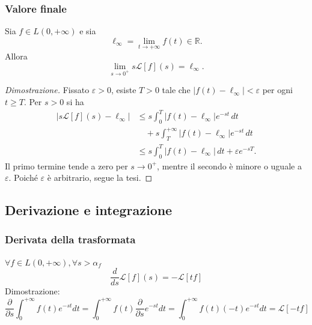             \subsubsection{Valore finale}
                Sia $f \in L(0,+\infty)$ e sia
                \[
                    \ell_\infty=\lim_{t\rightarrow+\infty}f(t)\in\mathbb{R}.
                \]
                Allora
                \[
                    \lim_{s\rightarrow0^+}s\mathcal{L}[f](s)=\ell_\infty.
                \]
                \begin{proof}[Dimostrazione]
                    Fissato $\varepsilon>0$, esiste $T>0$ tale che
                    $\lvert f(t)-\ell_\infty\rvert<\varepsilon$ per ogni
                    $t\geq T$. Per $s>0$ si ha
                    \begin{align*}
                        \lvert s\mathcal{L}[f](s)-\ell_\infty\rvert
                        &\leq s\int_0^T
                        \lvert f(t)-\ell_\infty\rvert e^{-st}\,dt \\
                        &\quad+s\int_T^{+\infty}
                        \lvert f(t)-\ell_\infty\rvert e^{-st}\,dt \\
                        &\leq s\int_0^T
                        \lvert f(t)-\ell_\infty\rvert\,dt
                        +\varepsilon e^{-sT}.
                    \end{align*}
                    Il primo termine tende a zero per $s\rightarrow0^+$,
                    mentre il secondo è minore o uguale a $\varepsilon$.
                    Poiché $\varepsilon$ è arbitrario, segue la tesi.
                \end{proof}

        \subsection{Derivazione e integrazione}
            \subsubsection{Derivata della trasformata}
                $\forall f \in L(0, +\infty), \forall s > \alpha_f$
                \[
                    \frac{d}{ds} \mathcal{L}[f](s) = - \mathcal{L}[tf]
                \]
                Dimostrazione:
                \[
                    \frac{\partial}{\partial s} \int_{0}^{+\infty} f(t) e^{-st} dt = \int_{0}^{+\infty} f(t) \frac{\partial}{\partial s} e^{-st} dt = \int_{0}^{+\infty} f(t)(-t) e^{-st} dt = \mathcal{L}[-tf]
                \]

